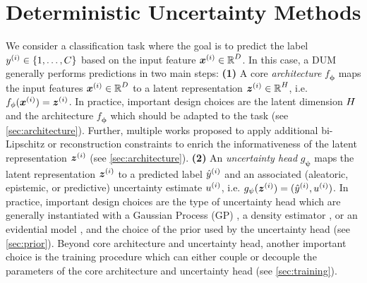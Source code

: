 \section{Deterministic Uncertainty Methods}
\label{sec:dum}

We consider a classification task where the goal is to predict the label $y^{(i)} \in \{ 1, \ldots , C \}$ based on the input feature ${\bm{x}}^{(i)} \in \operatorname{\mathbb{R}}^{D}$. In this case, a DUM generally performs predictions in two main steps: \textbf{(1)} A core \emph{architecture} $f_\mathbf{\phi}$ maps the input features ${\bm{x}}^{(i)} \in \operatorname{\mathbb{R}}^{D}$ to a latent representation ${\bm{z}}^{(i)} \in \operatorname{\mathbb{R}}^{H}$, i.e. $f_\mathbf{\phi}({\bm{x}}^{(i)})={\bm{z}}^{(i)}$. In practice, important design choices are the latent dimension $H$ and the architecture $f_\mathbf{\phi}$ which should be adapted to the task (see \cref{sec:architecture}). Further, multiple works proposed to apply additional bi-Lipschitz or reconstruction constraints to enrich the informativeness of the latent representation ${\bm{z}}^{(i)}$ (see \cref{sec:architecture}). \textbf{(2)} An \emph{uncertainty head} $g_\mathbf{\psi}$ maps the latent representation ${\bm{z}}^{(i)}$ to a predicted label $\hat{y}^{(i)}$ and an associated (aleatoric, epistemic, or predictive) uncertainty estimate $u^{(i)}$, i.e. $g_\mathbf{\psi}({\bm{z}}^{(i)})=(\hat{y}^{(i)}, u^{(i)})$. In practice, important design choices are the type of uncertainty head which are generally instantiated with a Gaussian Process (GP) \citep{uncertainty-distance-awareness, due, duq, uceloss, charpentier2022uncertainty-rl}, a density estimator \citep{charpentier2020, NatPN2021, charpentier2022uncertainty-rl, graph-postnet, uceloss, mukhoti2021ddu, postels2020mir, contrastive-ood, wu2020contrastive}, or an evidential model \citep{charpentier2020, NatPN2021, charpentier2022uncertainty-rl, graph-postnet, uceloss, malini2018}, and the choice of the prior used by the uncertainty head (see \cref{sec:prior}). Beyond core architecture and uncertainty head, another important choice is the training procedure which can either couple or decouple the parameters of the core architecture and uncertainty head (see \cref{sec:training}).

